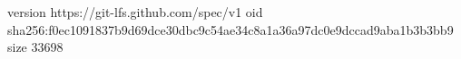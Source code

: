 version https://git-lfs.github.com/spec/v1
oid sha256:f0ec1091837b9d69dce30dbc9c54ae34c8a1a36a97dc0e9dccad9aba1b3b3bb9
size 33698
